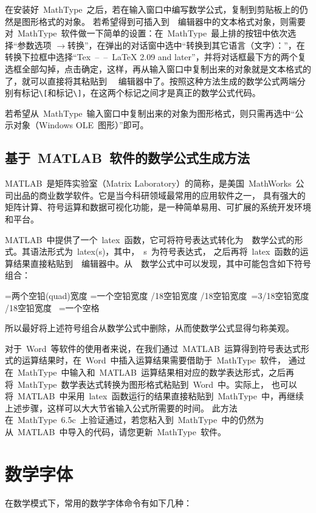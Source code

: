 在安装好~MathType~之后，若在输入窗口中编写数学公式，复制到剪贴板上的仍然是图形格式的对象。
若希望得到可插入到~\XeLaTeX~编辑器中的文本格式对象，则需要对~MathType~软件做一下简单的设置：在~MathType~最上排的按钮中依次选择“参数选项
$\to$转换”，在弹出的对话窗中选中“转换到其它语言（文字）：”，在转换下拉框中选择“Tex~--~--~LaTeX 2.09 and later”，并将对话框最下方的两个复选框全部勾掉，点击确定，这样，再从输入窗口中复制出来的对象就是文本格式的了，就可以直接将其粘贴到~\XeLaTeX~
编辑器中了。按照这种方法生成的数学公式两端分别有标记\verb|\[|和标记\verb|\]|，在这两个标记之间才是真正的数学公式代码。

若希望从~MathType~输入窗口中复制出来的对象为图形格式，则只需再选中“公示对象（Windows OLE~图形）”即可。

\subsection{基于~MATLAB~软件的数学公式生成方法}

MATLAB~是矩阵实验室（Matrix Laboratory）的简称，是美国~MathWorks~公司出品的商业数学软件。它是当今科研领域最常用的应用软件之一，
具有强大的矩阵计算、符号运算和数据可视化功能，是一种简单易用、可扩展的系统开发环境和平台。

MATLAB~中提供了一个~latex~函数，它可将符号表达式转化为~\XeLaTeX~数学公式的形式。其语法形式为~latex(s)，其中，~s~为符号表达式，
之后再将~latex~函数的运算结果直接粘贴到~\XeLaTeX~编辑器中。从~\XeLaTeX~数学公式中可以发现，其中可能包含如下符号组合：

\begin{verbatim*}
\qquad=两个空铅(quad)宽度
\quad=一个空铅宽度
/18空铅宽度
/18空铅宽度
\,=3/18空铅宽度
/18空铅宽度
\ =一个空格
\end{verbatim*}

所以最好将上述符号组合从数学公式中删除，从而使数学公式显得匀称美观。

对于~Word~等软件的使用者来说，在我们通过~MATLAB~运算得到符号表达式形式的运算结果时，在~Word~中插入运算结果需要借助于~MathType~软件，
通过在~MathType~中输入和~MATLAB~运算结果相对应的数学表达形式，之后再将~MathType~数学表达式转换为图形格式粘贴到~Word~中。实际上，
也可以将~MATLAB~中采用~latex~函数运行的结果直接粘贴到~MathType~中，再继续上述步骤，这样可以大大节省输入公式所需要的时间。
此方法在~MathType~6.5c~上验证通过，若您粘入到~MathType~中的仍然为从~MATLAB~中导入的代码，请您更新~MathType~软件。

\section{数学字体}
在数学模式下，常用的数学字体命令有如下几种：

